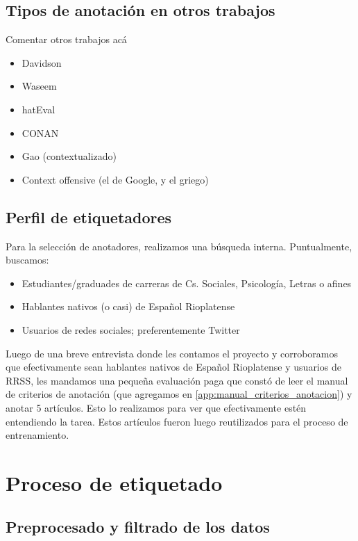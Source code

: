 \subsection{Tipos de anotación en otros trabajos}

Comentar otros trabajos acá

\begin{itemize}
    \item Davidson
    \item Waseem
    \item hatEval
    \item CONAN
    \item Gao (contextualizado)
    \item Context offensive (el de Google, y el griego)
\end{itemize}

\subsection{Perfil de etiquetadores}

Para la selección de anotadores, realizamos una búsqueda interna. Puntualmente, buscamos:

\begin{itemize}
    \item Estudiantes/graduades de carreras de Cs. Sociales, Psicología, Letras o afines
    \item Hablantes nativos (o casi) de Español Rioplatense
    \item Usuarios de redes sociales; preferentemente Twitter
\end{itemize}

Luego de una breve entrevista donde les contamos el proyecto y corroboramos que efectivamente sean hablantes nativos de Español Rioplatense y usuarios de RRSS, les mandamos una pequeña evaluación paga que constó de leer el manual de criterios de anotación (que agregamos en \ref{app:manual_criterios_anotacion}) y anotar 5 artículos. Esto lo realizamos para ver que efectivamente estén entendiendo la tarea. Estos artículos fueron luego reutilizados para el proceso de entrenamiento.

\section{Proceso de etiquetado}

\subsection{Preprocesado y filtrado de los datos}


